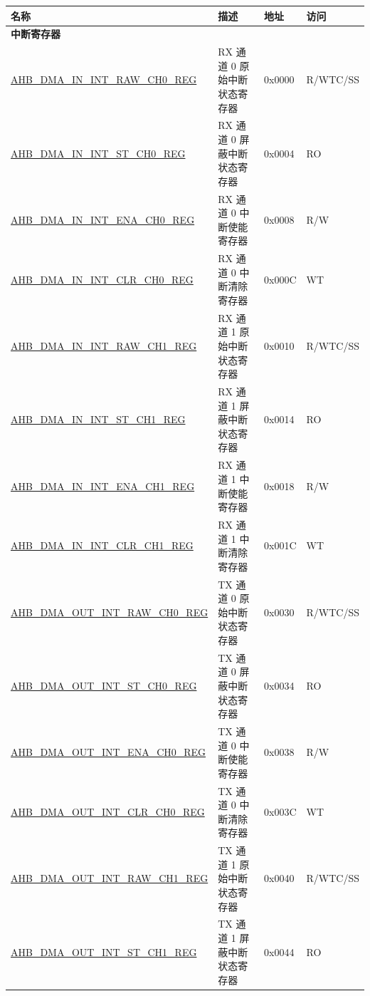 \begin{longtable}{ | p{8cm} | p{8cm} | p{1.3cm} | p{1.5cm} | }
\hline\rowcolor{lightgray}
\textbf{名称} & \textbf{描述} &  \textbf{地址} & \textbf{访问} \\ \hline
\endhead
\multicolumn{4}{|l|}{\textbf{中断寄存器}} \\ \hline
\hyperref[regdesc:AHBDMAININTRAWCHNREG]{AHB\_DMA\_IN\_INT\_RAW\_CH0\_REG} & RX 通道 0 原始中断状态寄存器 & 0x0000 & R/WTC/SS \\ \hline
\hyperref[regdesc:AHBDMAININTSTCHNREG]{AHB\_DMA\_IN\_INT\_ST\_CH0\_REG} & RX 通道 0 屏蔽中断状态寄存器 & 0x0004 & RO \\ \hline
\hyperref[regdesc:AHBDMAININTENACHNREG]{AHB\_DMA\_IN\_INT\_ENA\_CH0\_REG} & RX 通道 0 中断使能寄存器 & 0x0008 & R/W \\ \hline
\hyperref[regdesc:AHBDMAININTCLRCHNREG]{AHB\_DMA\_IN\_INT\_CLR\_CH0\_REG} & RX 通道 0 中断清除寄存器 & 0x000C & WT \\ \hline
\hyperref[regdesc:AHBDMAININTRAWCHNREG]{AHB\_DMA\_IN\_INT\_RAW\_CH1\_REG} & RX 通道 1 原始中断状态寄存器 & 0x0010 & R/WTC/SS \\ \hline
\hyperref[regdesc:AHBDMAININTSTCHNREG]{AHB\_DMA\_IN\_INT\_ST\_CH1\_REG} & RX 通道 1 屏蔽中断状态寄存器 & 0x0014 & RO \\ \hline
\hyperref[regdesc:AHBDMAININTENACHNREG]{AHB\_DMA\_IN\_INT\_ENA\_CH1\_REG} & RX 通道 1 中断使能寄存器 & 0x0018 & R/W \\ \hline
\hyperref[regdesc:AHBDMAININTCLRCHNREG]{AHB\_DMA\_IN\_INT\_CLR\_CH1\_REG} & RX 通道 1 中断清除寄存器 & 0x001C & WT \\ \hline
\hyperref[regdesc:AHBDMAOUTINTRAWCHNREG]{AHB\_DMA\_OUT\_INT\_RAW\_CH0\_REG} & TX 通道 0 原始中断状态寄存器 & 0x0030 & R/WTC/SS \\ \hline
\hyperref[regdesc:AHBDMAOUTINTSTCHNREG]{AHB\_DMA\_OUT\_INT\_ST\_CH0\_REG} & TX 通道 0 屏蔽中断状态寄存器 & 0x0034 & RO \\ \hline
\hyperref[regdesc:AHBDMAOUTINTENACHNREG]{AHB\_DMA\_OUT\_INT\_ENA\_CH0\_REG} & TX 通道 0 中断使能寄存器 & 0x0038 & R/W \\ \hline
\hyperref[regdesc:AHBDMAOUTINTCLRCHNREG]{AHB\_DMA\_OUT\_INT\_CLR\_CH0\_REG} & TX 通道 0 中断清除寄存器 & 0x003C & WT \\ \hline
\hyperref[regdesc:AHBDMAOUTINTRAWCHNREG]{AHB\_DMA\_OUT\_INT\_RAW\_CH1\_REG} & TX 通道 1 原始中断状态寄存器 & 0x0040 & R/WTC/SS \\ \hline
\hyperref[regdesc:AHBDMAOUTINTSTCHNREG]{AHB\_DMA\_OUT\_INT\_ST\_CH1\_REG} & TX 通道 1 屏蔽中断状态寄存器 & 0x0044 & RO \\ \hline

\end{longtable}
